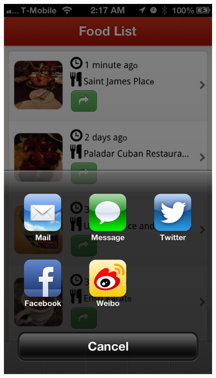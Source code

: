 \begin{figure}
{	\includegraphics[width=\figwidth, totalheight=\figheight, keepaspectratio]{./screenshots/foodlist-share.png}} \hfill 
\end{figure}
